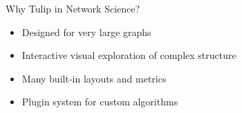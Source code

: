 \begin{frame}{Why Tulip in Network Science?}
	\begin{itemize}
		\item Designed for very large graphs
		\item Interactive visual exploration of complex structure
		\item Many built‑in layouts and metrics
		\item Plugin system for custom algorithms
	\end{itemize}
\end{frame}